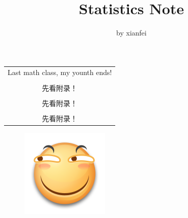 \documentclass[a4paper]{ctexart}    %
\title{\textbf{Statistics Note}}
\author{by xianfei}
\date{}
\begin{document}
	\maketitle
	\noindent
	\thispagestyle{empty}
	\begin{table}[htbp!]
		\centering
		\begin{tabular}{c}
			\Large Last math class, my younth ends! \\
			\\
			\Large 先看附录！ \\ \\
			\huge 先看附录！ \\ \\
			\Huge 先看附录！ 
		\end{tabular}
	\end{table}
	\newpage
	\thispagestyle{empty}
	\tableofcontents
	\begin{figure}[htbp!]
		\centering
		\includegraphics{huaji1.png}
	\end{figure}
	\newpage
\end{document}
